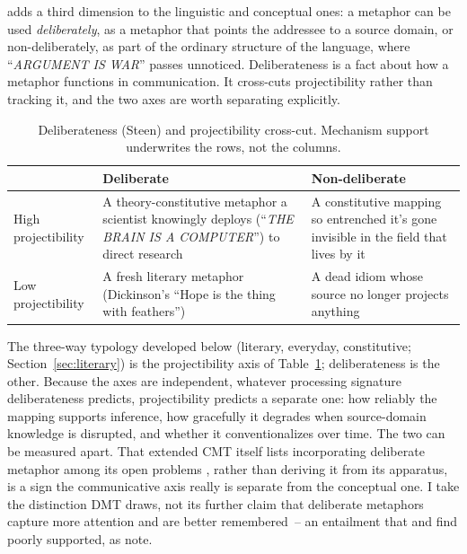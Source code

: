 \documentclass[12pt]{article}
\newcommand{\metaphor}[1]{\enquote{\textit{\MakeUppercase{#1}}}}
\begin{document}
\textcite{steen2008} adds a third dimension to the linguistic and conceptual ones: a metaphor can be used \emph{deliberately}, as a metaphor that points the addressee to a source domain, or non-deliberately, as part of the ordinary structure of the language, where \metaphor{argument is war} passes unnoticed. Deliberateness is a fact about how a metaphor functions in communication. It cross-cuts projectibility rather than tracking it, and the two axes are worth separating explicitly.

\begin{table}[ht]
\centering\small
\begin{tabular}{@{}>{\raggedright\arraybackslash}p{}>{\raggedright\arraybackslash}p{}>{\raggedright\arraybackslash}p{}@{}}
\toprule
 & Deliberate & Non-deliberate \\
\midrule
High projectibility & A theory-constitutive metaphor a scientist knowingly deploys (\metaphor{the brain is a computer}) to direct research & A constitutive mapping so entrenched it's gone invisible in the field that lives by it \\[6pt]
Low projectibility & A fresh literary metaphor (Dickinson's \enquote{Hope is the thing with feathers}) & A dead idiom whose source no longer projects anything \\
\bottomrule
\end{tabular}
\caption{Deliberateness (Steen) and projectibility cross-cut. Mechanism support underwrites the rows, not the columns.}
\label{tab:deliberate-projectibility}
\end{table}

The three-way typology developed below (literary, everyday, constitutive; Section~\ref{sec:literary}) is the projectibility axis of Table~\ref{tab:deliberate-projectibility}; deliberateness is the other. Because the axes are independent, whatever processing signature deliberateness predicts, projectibility predicts a separate one: how reliably the mapping supports inference, how gracefully it degrades when source-domain knowledge is disrupted, and whether it conventionalizes over time. The two can be measured apart. That extended CMT itself lists incorporating deliberate metaphor among its open problems \citep[113]{kovecses2020article}, rather than deriving it from its apparatus, is a sign the communicative axis really is separate from the conceptual one. I take the distinction DMT draws, not its further claim that deliberate metaphors capture more attention and are better remembered~-- an entailment that \textcite{gibbs2015dmt} and \textcite{thibodeau2017} find poorly supported, as \textcite{flusberg2018} note.
\end{document}
